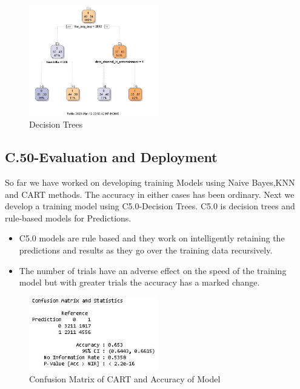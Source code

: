 \documentclass[sigchi]{acmart}
\begin{document}
\begin{figure}[h!]
    \caption{Decision Trees}
    \centering
    \includegraphics[width=0.50\textwidth]{CART_TREE.JPG}
\end{figure}

\subsection{C.50-Evaluation and Deployment}

So far we have worked on developing training Models using Naive Bayes,KNN and CART methods. The accuracy in either cases has been ordinary. Next we develop a training model using C5.0-Decision Trees. C5.0\cite{PackageC50} is decision trees and rule-based models for Predictions.

\begin{itemize}
    \item C5.0 models are rule based and they work on intelligently retaining the predictions and results as they go over the training data recursively.
    \item The number of trials have an adverse effect on the speed of the training model but with greater trials the accuracy has a marked change.
\end{itemize}

\begin{figure}[h!]
    \caption{Confusion Matrix of CART and Accuracy of Model}
    \centering
    \includegraphics[width=0.50\textwidth]{ConfusionMatrixand Accuracy of C5.0.JPG}
\end{figure} 
\end{document}
